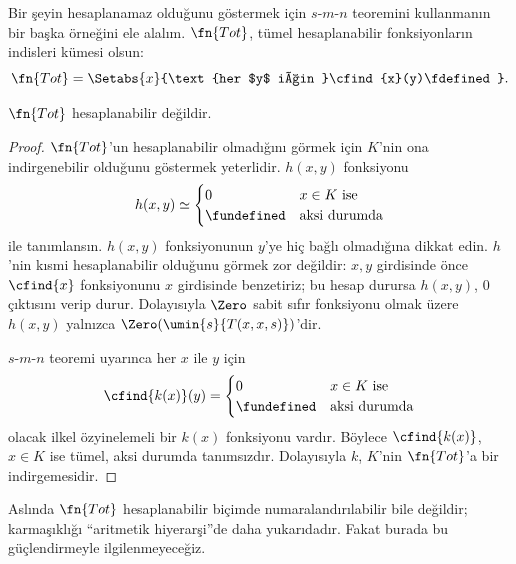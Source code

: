 


Bir şeyin hesaplanamaz olduğunu göstermek için $s$-$m$-$n$ teoremini
kullanmanın bir başka örneğini ele alalım. $\fn{Tot}$, tümel hesaplanabilir
fonksiyonların indisleri kümesi olsun:
\[
  \fn{Tot}=\Setabs{x}{\text{her $y$ için }\cfind{x}(y)\fdefined}.
\]

\begin{prop}
$\fn{Tot}$ hesaplanabilir değildir.
\end{prop}

\begin{proof}
$\fn{Tot}$'un hesaplanabilir olmadığını görmek için $K$'nin ona
indirgenebilir olduğunu göstermek yeterlidir. $h(x,y)$ fonksiyonu
\[
  h(x,y)\simeq\begin{cases}
    0 & \text{$x\in K$ ise}\\
    \fundefined & \text{aksi durumda}
  \end{cases}
\]
ile tanımlansın. $h(x,y)$ fonksiyonunun $y$'ye hiç bağlı olmadığına dikkat
edin. $h$'nin kısmi hesaplanabilir olduğunu görmek zor değildir: $x,y$
girdisinde önce $\cfind{x}$ fonksiyonunu $x$ girdisinde benzetiriz; bu hesap
durursa $h(x,y)$, $0$ çıktısını verip durur. Dolayısıyla $\Zero$ sabit sıfır
fonksiyonu olmak üzere $h(x,y)$ yalnızca
$\Zero(\umin{s}{T(x,x,s)})$'dir.

$s$-$m$-$n$ teoremi uyarınca her $x$ ile $y$ için
\[
  \cfind{k(x)}(y)=\begin{cases}
    0 & \text{$x\in K$ ise}\\
    \fundefined & \text{aksi durumda}
  \end{cases}
\]
olacak ilkel özyinelemeli bir $k(x)$ fonksiyonu vardır. Böylece
$\cfind{k(x)}$, $x\in K$ ise tümel, aksi durumda tanımsızdır. Dolayısıyla
$k$, $K$'nin $\fn{Tot}$'a bir indirgemesidir.
\end{proof}

\begin{digress}
Aslında $\fn{Tot}$ hesaplanabilir biçimde numaralandırılabilir bile değildir;
karmaşıklığı ``aritmetik hiyerarşi''de daha yukarıdadır. Fakat burada bu
güçlendirmeyle ilgilenmeyeceğiz.
\end{digress}

